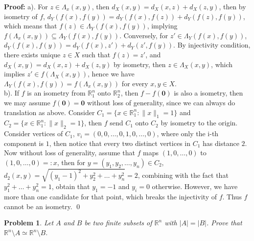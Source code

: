 \documentclass[12pt]{article}
\newtheorem{problem}{Problem}
\begin{document}
\textbf{Proof:} a). For $z\in \Lambda_{x}(x,y)$, then $d_{X}(x,y) = d_{X}(x,z) + d_{X}(z,y)$, then by isometry of $f$, $d_{Y}(f(x), f(y))=d_{Y}(f(x), f(z))+d_{Y}(f(z), f(y))$, which means that $f(z)\in\Lambda_{Y}(f(x), f(y))$, implying $f(\Lambda_{x}(x,y))\subseteq \Lambda_{Y}(f(x), f(y))$. Conversely, for $z'\in \Lambda_{Y}(f(x), f(y))$, $d_{Y}(f(x), f(y))=d_{Y}(f(x), z')+d_{Y}(z', f(y))$. By injectivity condition, there exists unique $z\in X$ such that $f(z)=z'$, and $d_{X}(x, y)=d_{X}(x, z)+d_{X}(z, y)$ by isometry, then $z\in \Lambda_{X}(x, y)$, which implies $z'\in f(\Lambda_{X}(x,y))$, hence we have $\Lambda_{Y}(f(x), f(y))=f(\Lambda_{x}(x,y))$ for every $x,y\in X$. \\
\indent b). If $f$ is an isometry from $\mathbb{R}_{1}^{n}$ onto $\mathbb{R}^{n}_{2}$, then $f-f(\mathbf{0})$ is also a isometry, then we may assume $f(\mathbf{0})=\mathbf{0}$ without loss of generality, since we can always do translation as above. Consider $C_{1} = \{x\in \mathbb{R}^{n}_{1}: \|x\|_{1}=1\}$ and $C_{2}=\{x\in\mathbb{R}^{n}_{1}: \|x\|_{2}=1\}$, then $f$ send $C_{1}$ onto $C_{2}$ by isometry to the origin. Consider vertices of $C_{1}$, $v_{i}=(0, 0, \dots, 0, 1, 0, \dots, 0)$, where only the i-th component is $1$, then notice that every two distinct vertices in $C_{1}$ has distance $2$. Now without loss of generality, assume that $f$ maps $(1, 0, \dots, 0)$ to $(1, 0, \dots, 0)=:x$, then for $y=(y_{1}, y_{2}, \dots, y_{n})\in C_{2}$, $d_{2}(x,y)=\sqrt{(y_{1}-1)^{2}+y_{2}^{2}+\dots+y_{n}^{2}}=2$, combining with the fact that $y_{1}^{2}+\dots+y_{n}^{2}=1$, obtain that $y_{1}=-1$ and $y_{i}=0$ otherwise. However, we have more than one candidate for that point, which breaks the injectivity of $f$. Thus $f$ cannot be an isometry. \qed
\\
\begin{problem}
Let $A$ and $B$ be two finite subsets of $\mathbb{R}^{n}$ with $|A|=|B|$. Prove that $\mathbb{R}^{n}\setminus A\simeq\mathbb{R}^{n}\setminus B$.
\end{problem}
\end{document}
